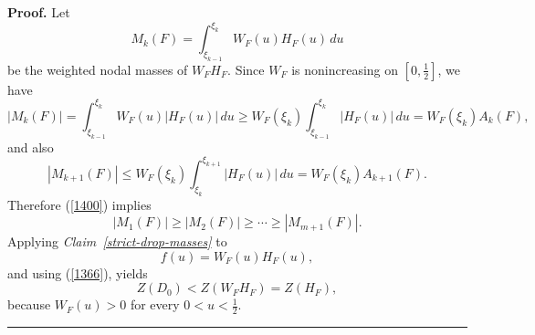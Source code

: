 \documentclass[onecolumn]{article}
\newenvironment{proof}[1][Proof]{\noindent\textbf{#1.} }{\ \rule{0.5em}{0.5em}}
\begin{document}
\begin{proof}
Let 
\begin{equation}
M_{k}(F)=\int_{\xi _{k-1}}^{\xi _{k}}W_{F}(u)H_{F}(u)\,du  \label{1403}
\end{equation}%
be the weighted nodal masses of $W_{F}H_{F}$. Since $W_{F}$ is nonincreasing
on $[0,\tfrac{1}{2}]$, we have 
\begin{equation}
|M_{k}(F)|=\int_{\xi _{k-1}}^{\xi _{k}}W_{F}(u)|H_{F}(u)|\,du\geq W_{F}(\xi
_{k})\int_{\xi _{k-1}}^{\xi _{k}}|H_{F}(u)|\,du=W_{F}(\xi _{k})A_{k}(F),
\label{1404}
\end{equation}%
and also 
\begin{equation}
|M_{k+1}(F)|\leq W_{F}(\xi _{k})\int_{\xi _{k}}^{\xi
_{k+1}}|H_{F}(u)|\,du=W_{F}(\xi _{k})A_{k+1}(F).  \label{1405}
\end{equation}%
Therefore (\ref{1400}) implies 
\begin{equation}
|M_{1}(F)|\geq |M_{2}(F)|\geq \cdots \geq |M_{m+1}(F)|.  \label{1406}
\end{equation}%
Applying \textit{Claim~\ref{strict-drop-masses}} to 
\begin{equation}
f(u)=W_{F}(u)H_{F}(u),  \label{1407}
\end{equation}%
and using (\ref{1366}), yields 
\begin{equation}
Z(D_{0})<Z(W_{F}H_{F})=Z(H_{F}),  \label{1408}
\end{equation}%
because $W_{F}(u)>0$ for every $0<u<\tfrac{1}{2}$. \hfill
\end{proof}
\end{document}
